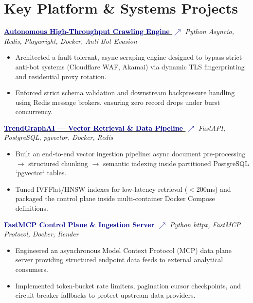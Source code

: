 \documentclass[10pt]{article}
\newcommand{\faExternalLink}{$\nearrow$}
\begin{document}
\section*{Key Platform \& Systems Projects}

\noindent\href{https://github.com/hemal9102/crawler}{\textbf{\textcolor{darkblue}{Autonomous High-Throughput Crawling Engine \faExternalLink}}} \hfill \textit{\small\color{medgray}Python Asyncio, Redis, Playwright, Docker, Anti-Bot Evasion}
\begin{itemize}
\item Architected a fault-tolerant, async scraping engine designed to bypass strict anti-bot systems (Cloudflare WAF, Akamai) via dynamic TLS fingerprinting and residential proxy rotation.
\item Enforced strict schema validation and downstream backpressure handling using Redis message brokers, ensuring zero record drops under burst concurrency.
\end{itemize}

\vspace{2pt}

\noindent\href{https://github.com/hemal9102/trendgraphAI}{\textbf{\textcolor{darkblue}{TrendGraphAI --- Vector Retrieval \& Data Pipeline \faExternalLink}}} \hfill \textit{\small\color{medgray}FastAPI, PostgreSQL, pgvector, Docker, Redis}
\begin{itemize}
\item Built an end-to-end vector ingestion pipeline: async document pre-processing $\rightarrow$ structured chunking $\rightarrow$ semantic indexing inside partitioned PostgreSQL `pgvector` tables.
\item Tuned IVFFlat/HNSW indexes for low-latency retrieval ($<$200ms) and packaged the control plane inside multi-container Docker Compose definitions.
\end{itemize}

\vspace{2pt}

\noindent\href{https://scraper-o801.onrender.com/}{\textbf{\textcolor{darkblue}{FastMCP Control Plane \& Ingestion Server \faExternalLink}}} \hfill \textit{\small\color{medgray}Python httpx, FastMCP Protocol, Docker, Render}
\begin{itemize}
\item Engineered an asynchronous Model Context Protocol (MCP) data plane server providing structured endpoint data feeds to external analytical consumers.
\item Implemented token-bucket rate limiters, pagination cursor checkpoints, and circuit-breaker fallbacks to protect upstream data providers.
\end{itemize}
\end{document}
